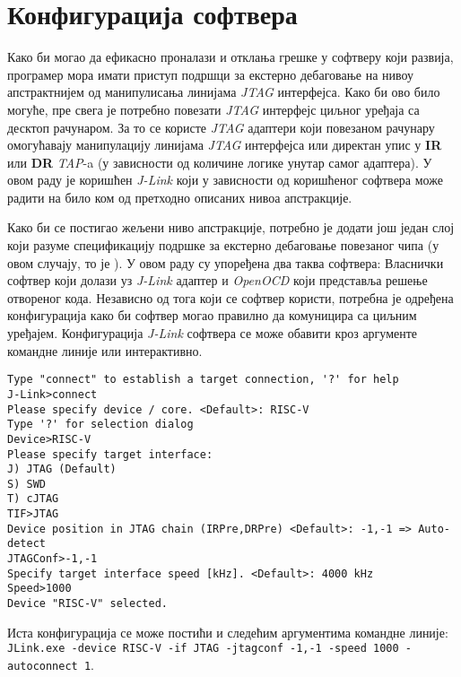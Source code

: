 \chapter{Конфигурација софтвера}

Како би могао да ефикасно проналази и отклања грешке у софтверу који развија, програмер мора имати приступ подршци за екстерно дебаговање на нивоу апстрактнијем од манипулисања линијама \textit{\acrshort{JTAG}} интерфејса. Како би ово било могуће, пре свега је потребно повезати  \textit{\acrshort{JTAG}} интерфејс циљног уређаја са десктоп рачунаром. За то се користе \textit{\acrshort{JTAG}} адаптери који повезаном рачунару омогућавају манипулацију линијама \textit{\acrshort{JTAG}} интерфејса или директан упис у \textbf{\acrshort{IR}} или \textbf{\acrshort{DR}} \textit{\acrshort{TAP}}-a (у зависности од количине логике унутар самог адаптера). У овом раду је коришћен \textit{J-Link} који у зависности од коришћеног софтвера може радити на било ком од претходно описаних нивоа апстракције.

Како би се постигао жељени ниво апстракције, потребно је додати још један слој који разуме спецификацију подршке за екстерно дебаговање повезаног чипа (у овом случају, то је \cite{debug_spec}). У овом раду су упоређена два таква софтвера: Власнички софтвер који долази уз \textit{J-Link} адаптер и \textit{Open\acrshort{OCD}} који представља решење отвореног кода. Независно од тога који се софтвер користи, потребна је одређена конфигурација како би софтвер могао правилно да комуницира са циљним уређајем. Конфигурација \textit{J-Link} софтвера се може обавити кроз аргументе командне линије или интерактивно. 

\begin{lstlisting}[language=none,caption=Интерактивна конфигурација \textit{J-Link} софтвера неопходна за повезивање на имплементирано језгро]
Type "connect" to establish a target connection, '?' for help
J-Link>connect
Please specify device / core. <Default>: RISC-V
Type '?' for selection dialog
Device>RISC-V
Please specify target interface:
J) JTAG (Default)
S) SWD
T) cJTAG
TIF>JTAG
Device position in JTAG chain (IRPre,DRPre) <Default>: -1,-1 => Auto-detect
JTAGConf>-1,-1
Specify target interface speed [kHz]. <Default>: 4000 kHz
Speed>1000
Device "RISC-V" selected.
\end{lstlisting}

Иста конфигурација се може постићи и следећим аргументима командне линије:\\ \lstinline[language=none,columns=fixed]{JLink.exe -device RISC-V -if JTAG -jtagconf -1,-1 -speed 1000 -autoconnect 1}.

